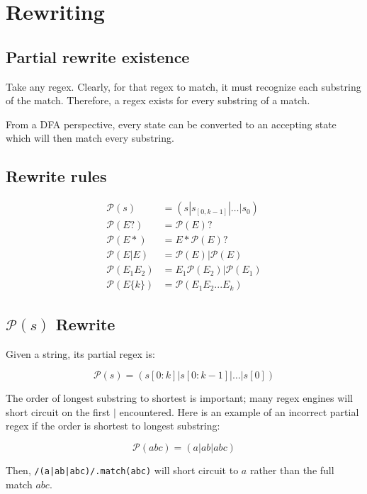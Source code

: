 \documentclass{article}
\newcommand{\ssre}{\mathcal{P}}
\begin{document}
\section{Rewriting}

\subsection*{Partial rewrite existence}

Take any regex. Clearly, for that regex to match, it must recognize each substring of the
match. Therefore, a regex exists for every substring of a match.

From a DFA perspective, every state can be converted to an accepting state which will then match
every substring.

\subsection*{Rewrite rules}

\begin{align*}
\ssre(s) &= (s|s_{[0,k-1]}|\ldots |s_0)\\
\ssre(E?) &= \ssre(E)?\\
\ssre(E*) &= E*\ssre(E)?\\
\ssre(E|E) &= \ssre(E)|\ssre(E)\\
\ssre(E_{1}E_{2}) &= E_{1}\ssre(E_{2})|\ssre(E_{1})\\
\ssre(E\{k\}) &= \ssre(E_{1}E_{2}...E_{k})
\end{align*}   

\subsection*{$\ssre(s)$ Rewrite}

Given a string, its partial regex is:

\begin{equation*}
    \ssre(s) = (s[0:k]|s[0:k-1]|\ldots|s[0])
\end{equation*}

The order of longest substring to shortest is important; many regex engines
will short circuit on the first $|$ encountered. Here is an example of an
incorrect partial regex if the order is shortest to longest substring:

\begin{equation*}
    \ssre(abc) = (a|ab|abc)
\end{equation*}

Then, \texttt{/(a|ab|abc)/.match(abc)} will short circuit to $a$ rather than the full match $abc$.
\end{document}
